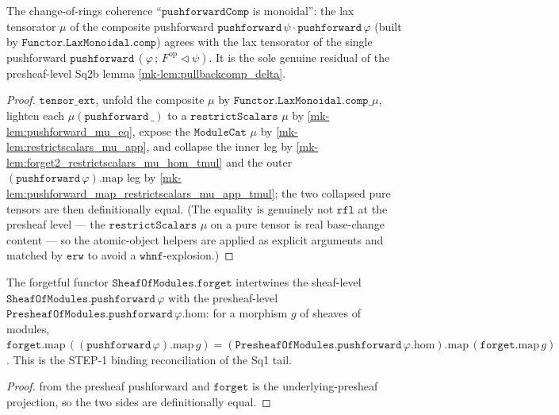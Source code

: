\begin{lemma}\label{mk-lem:pushforwardcomp_lax_mu}
  \leanok

  The change-of-rings coherence ``\(\mathtt{pushforwardComp}\) is monoidal'': the lax
  tensorator \(\mu\) of the composite pushforward
  \(\mathtt{pushforward}\,\psi \cdot \mathtt{pushforward}\,\varphi\) (built by
  \(\mathtt{Functor.LaxMonoidal.comp}\)) agrees with the lax tensorator of the single
  pushforward \(\mathtt{pushforward}\,(\varphi \,;\, F^{\mathrm{op}} \!\lhd\! \psi)\). It is
  the sole genuine residual of the presheaf-level Sq2b lemma \ref{mk-lem:pullbackcomp_delta}.
\end{lemma}
\begin{proof}
  \leanok
  \(\mathtt{tensor\_ext}\), unfold the composite \(\mu\) by \(\mathtt{Functor.LaxMonoidal.comp\_}\mu\),
  lighten each \(\mu(\mathtt{pushforward}\,\_)\) to a \(\mathtt{restrictScalars}\) \(\mu\) by
  \ref{mk-lem:pushforward_mu_eq}, expose the \(\mathtt{ModuleCat}\) \(\mu\) by
  \ref{mk-lem:restrictscalars_mu_app}, and collapse the inner leg by
  \ref{mk-lem:forget2_restrictscalars_mu_hom_tmul} and the outer
  \((\mathtt{pushforward}\,\varphi).\mathrm{map}\) leg by
  \ref{mk-lem:pushforward_map_restrictscalars_mu_app_tmul}; the two collapsed pure tensors are
  then definitionally equal. (The equality is genuinely not \(\mathtt{rfl}\) at the presheaf
  level --- the \(\mathtt{restrictScalars}\) \(\mu\) on a pure tensor is real base-change
  content --- so the atomic-object helpers are applied as explicit arguments and matched by
  \(\mathtt{erw}\) to avoid a \(\mathtt{whnf}\)-explosion.)
\end{proof}

\begin{lemma}\label{mk-lem:forget_map_pushforward_map}
  \leanok

  The forgetful functor \(\mathtt{SheafOfModules.forget}\) intertwines the sheaf-level
  \(\mathtt{SheafOfModules.pushforward}\,\varphi\) with the presheaf-level
  \(\mathtt{PresheafOfModules.pushforward}\,\varphi.\mathrm{hom}\): for a morphism \(g\) of
  sheaves of modules, \(\mathtt{forget}.\mathrm{map}\,((\mathtt{pushforward}\,\varphi)
  .\mathrm{map}\,g) = (\mathtt{PresheafOfModules.pushforward}\,\varphi.\mathrm{hom})
  .\mathrm{map}\,(\mathtt{forget}.\mathrm{map}\,g)\). This is the STEP-1 binding
  reconciliation of the Sq1 tail.
\end{lemma}
\begin{proof}
  \leanok
  from the presheaf pushforward and \(\mathtt{forget}\) is the underlying-presheaf
  projection, so the two sides are definitionally equal.
\end{proof}

